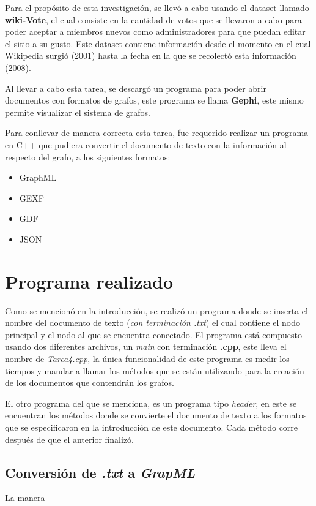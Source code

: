 \documentclass[acmsmall]{acmart}
\begin{document}
Para el propósito de esta investigación, se llevó a cabo usando el dataset llamado \textbf{wiki-Vote}, el cual consiste en la cantidad de votos que se llevaron a cabo para poder aceptar a miembros nuevos como administradores para que puedan editar el sitio a su gusto. Este dataset contiene información desde el momento en el cual Wikipedia surgió (2001) hasta la fecha en la que se recolectó esta información (2008).

Al llevar a cabo esta tarea, se descargó un programa para poder abrir documentos con formatos de grafos, este programa se llama \textbf{Gephi}, este mismo permite visualizar el sistema de grafos.

Para conllevar de manera correcta esta tarea, fue requerido realizar un programa en C++ que pudiera convertir el documento de texto con la información al respecto del grafo, a los siguientes formatos:
\begin{itemize}
\item GraphML
\item GEXF
\item GDF
\item JSON
\end{itemize}


\section{Programa realizado}
Como se mencionó en la introducción, se realizó un programa donde se inserta el nombre del documento de texto (\textit{con terminación .txt}) el cual contiene el nodo principal y el nodo al que se encuentra conectado. El programa está compuesto usando dos diferentes archivos, un \textit{main} con terminación \textbf{.cpp}, este lleva el nombre de \textit{Tarea4.cpp}, la única funcionalidad de este programa es medir los tiempos y mandar a llamar los métodos que se están utilizando para la creación de los documentos que contendrán los grafos.

El otro programa del que se menciona, es un programa tipo \textit{header}, en este se encuentran los métodos donde se convierte el documento de texto a los formatos que se especificaron en la introducción de este documento. Cada método corre después de que el anterior finalizó.


\subsection{Conversión de \textit{.txt} a \textit{GrapML}}
La manera 
\end{document}
